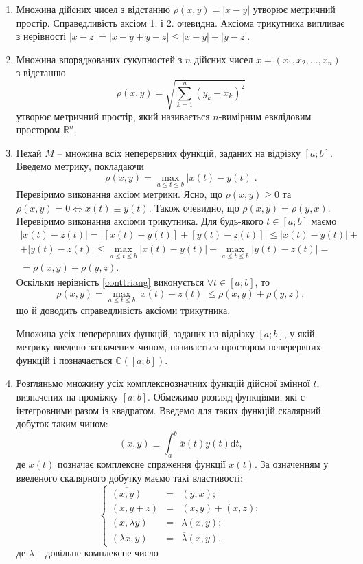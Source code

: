 \documentclass[14pt,twoside]{extreport}
\theoremstyle{mystyle}
\numberwithin{equation}{chapter}
\newcommand{\cab}{\mathbb{C}([a; b])}
\begin{document}
\begin{enumerate}
 \item Множина дійсних чисел з відстанню $\rho(x, y) = |x-y|$ утворює метричний простір. Справедливість аксіом 1. і 2. очевидна. Аксіома трикутника випливає з нерівності $|x-z|=|x-y+y-z|\leqslant|x-y|+|y-z|$.
 \item Множина впорядкованих сукупностей з $n$ дійсних чисел $x = (x_1, x_2, \ldots, x_n)$ з відстанню
 \begin{equation}
  \rho(x,y)=\sqrt{\sum\limits_{k=1}^{n}(y_k-x_k)^2}
 \end{equation}
 утворює метричний простір, який називається $n$-вимірним евклідовим простором $\mathbb{R}^n$.
 \item Нехай $M$ -- множина всіх неперервних функцій, заданих на відрізку $[a; b]$. Введемо метрику, покладаючи
 \[
  \rho(x, y) = \max\limits_{a\leqslant t \leqslant b}|x(t) - y(t)|.
 \]
 Перевіримо виконання аксіом метрики. Ясно, що $\rho(x, y) \geqslant 0$ та $\rho(x, y) = 0 \Leftrightarrow x(t)\equiv y(t)$. Також очевидно, що $\rho(x, y) =\rho(y, x)$. Перевіримо виконання аксіоми трикутника. Для будь-якого $t\in [a; b]$ маємо
 \begin{multline}\label{conttriang}
  |x(t) - z(t)| = |[x(t) - y(t)] + [y(t)-z(t)]|\leqslant |x(t) - y(t)| + \\
  +|y(t) - z(t)| \leqslant \max\limits_{a\leqslant t \leqslant b}|x(t) - y(t)| + \max\limits_{a\leqslant t \leqslant b} |y(t) - z(t)| =\\
  = \rho(x, y) + \rho(y, z).
 \end{multline}
 Оскільки нерівність \eqref{conttriang} виконується $\forall t \in [a; b]$, то
 \[
  \rho(x, y) = \max\limits_{a\leqslant t \leqslant b} |x(t) - z(t)| \leqslant \rho(x, y) + \rho (y, z),
 \]
 що й доводить справедливість аксіоми трикутника.

 Множина усіх неперервних функцій, заданих на відрізку $[a; b]$, у якій метрику введено зазначеним чином, називається простором неперервних функцій і позначається $\cab$.
 \item Розгляньмо множину усіх комплекснозначних функцій дійсної змінної $t$, визначених на проміжку $[a; b]$. Обмежимо розгляд функціями, які є інтегровними разом із квадратом. Введемо для таких функцій скалярний добуток таким чином:
\begin{equation}
 (x, y) \equiv \int_{a}^{b} \overline{x}(t) y(t) \mathrm{d}t,
\end{equation}
де $\overline{x}(t)$ позначає комплексне спряження функції $x(t)$. За означенням у введеного скалярного добутку маємо такі властивості:
\begin{equation}
 \left\{
 \begin{array}{ccc}
  \overline{(x, y)} &=& (y, x);\\
  (x, y+z) &=& (x, y) + (x, z);\\
  (x, \lambda y) &=& \lambda(x, y);\\
  (\lambda x, y) &=& \overline{\lambda} (x, y),
 \end{array}
 \right.
 \end{equation}
 де $\lambda$ -- довільне комплексне число


\end{enumerate}
\end{document}
